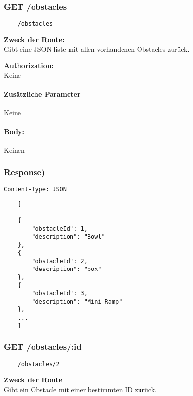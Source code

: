 \label{/obstacles}

\subsubsection{GET /obstacles}

\begin{lstlisting}
    /obstacles
\end{lstlisting}

\textbf{Zweck der Route:} \\
Gibt  eine JSON liste mit allen vorhandenen Obstacles zurück.

\textbf{Authorization:} \\
Keine

\paragraph{Zusätzliche Parameter}
Keine

\paragraph{Body:}

Keinen

\subsubsection{Response)}

\lstinline{Content-Type: JSON}
\begin{lstlisting}
    [
        
    {
        "obstacleId": 1,
        "description": "Bowl"
    },
    {
        "obstacleId": 2,
        "description": "box"
    },
    {
        "obstacleId": 3,
        "description": "Mini Ramp"
    },
    ...
    ]
\end{lstlisting}

\pagebreak

\subsubsection{GET /obstacles/:id}

\begin{lstlisting}
    /obstacles/2
\end{lstlisting}

\textbf{Zweck der Route} \\
Gibt ein Obstacle mit einer bestimmten ID zurück.




